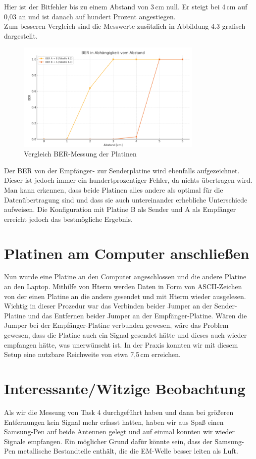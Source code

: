 Hier ist der Bitfehler bis zu einem Abstand von 3\,cm null. Er steigt bei 4\,cm auf 0,03 an und ist
danach auf hundert Prozent angestiegen.\\
Zum besseren Vergleich sind die Messwerte zusätzlich in Abbildung 4.3 grafisch dargestellt.

\begin{figure}[H]
    \centering
    \includegraphics[width=0.8\textwidth]{Pictures/diagramm.png}
    \caption{Vergleich BER-Messung der Platinen}
\end{figure}

Der BER von der Empfänger- zur Senderplatine wird ebenfalls aufgezeichnet. Dieser ist jedoch
immer ein hundertprozentiger Fehler, da nichts übertragen wird.
Man kann erkennen, dass beide Platinen alles andere als optimal für die Datenübertragung sind und
dass sie auch untereinander erhebliche Unterschiede aufweisen. Die Konfiguration mit Platine B als Sender und A als Empfänger erreicht jedoch
das bestmögliche Ergebnis.

\section{Platinen am Computer anschließen}
Nun wurde eine Platine an den Computer angeschlossen und die andere Platine an den Laptop.
Mithilfe von Hterm werden Daten in Form von ASCII-Zeichen von der einen Platine an die andere gesendet
und mit Hterm wieder ausgelesen.
Wichtig in dieser Prozedur war das Verbinden beider Jumper an der Sender-Platine und das Entfernen beider
Jumper an der Empfänger-Platine. 
Wären die Jumper bei der Empfänger-Platine verbunden gewesen, wäre das Problem gewesen, dass die Platine auch 
ein Signal gesendet hätte und dieses auch wieder empfangen hätte, was unerwünscht ist.
In der Praxis konnten wir mit diesem Setup eine nutzbare Reichweite von etwa 7,5\,cm erreichen.

\section{Interessante/Witzige Beobachtung}
Als wir die Messung von Task 4 durchgeführt haben und dann bei größeren Entfernungen kein Signal mehr erfasst hatten,
haben wir aus Spaß einen Samsung-Pen auf beide Antennen gelegt und auf einmal konnten wir wieder Signale empfangen.
Ein möglicher Grund dafür könnte sein, dass der Samsung-Pen metallische Bestandteile enthält,
die die EM-Welle besser leiten als Luft.


